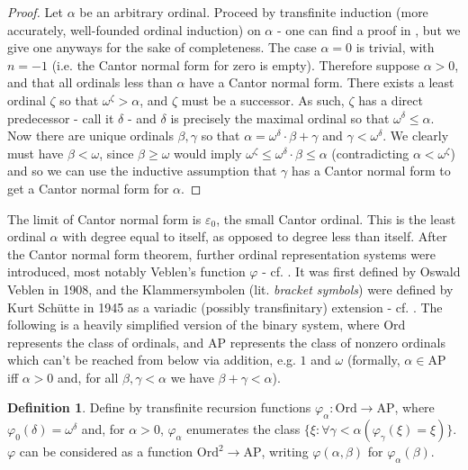 \documentclass{article}
\theoremstyle{definition}
\newtheorem{definition}{Definition}[section]
\theoremstyle{plain}
\theoremstyle{plain}
\theoremstyle{plain}
\theoremstyle{plain}
\theoremstyle{remark}
\theoremstyle{remark}
\theoremstyle{remark}
\theoremstyle{plain}
\theoremstyle{plain}
\begin{document}
\begin{proof}
Let $\alpha$ be an arbitrary ordinal. Proceed by transfinite induction (more accurately, well-founded ordinal induction) on $\alpha$ - one can find a proof in \cite{cantor}, but we give one anyways for the sake of completeness. The case $\alpha = 0$ is trivial, with $n = -1$ (i.e. the Cantor normal form for zero is empty). Therefore suppose $\alpha > 0$, and that all ordinals less than $\alpha$ have a Cantor normal form. There exists a least ordinal $\zeta$ so that $\omega^\zeta > \alpha$, and $\zeta$ must be a successor. As such, $\zeta$ has a direct predecessor - call it $\delta$ - and $\delta$ is precisely the maximal ordinal so that $\omega^\delta \leq \alpha$. Now there are unique ordinals $\beta, \gamma$ so that $\alpha = \omega^\delta \cdot \beta + \gamma$ and $\gamma < \omega^\delta$. We clearly must have $\beta < \omega$, since $\beta \geq \omega$ would imply $\omega^\zeta \leq \omega^\delta \cdot \beta \leq \alpha$ (contradicting $\alpha < \omega^\zeta$) and so we can use the inductive assumption that $\gamma$ has a Cantor normal form to get a Cantor normal form for $\alpha$.
\end{proof}

The limit of Cantor normal form is $\varepsilon_0$, the small Cantor ordinal. This is the least ordinal $\alpha$ with degree equal to itself, as opposed to degree less than itself. After the Cantor normal form theorem, further ordinal representation systems were introduced, most notably Veblen's function $\varphi$ - cf. \cite{veblen}. It was first defined by Oswald Veblen in 1908, and the Klammersymbolen (lit. \textit{bracket symbols}) were defined by Kurt Schütte in 1945 as a variadic (possibly transfinitary) extension - cf. \cite{schutte}. The following is a heavily simplified version of the binary system, where $\mathrm{Ord}$ represents the class of ordinals, and $\mathrm{AP}$ represents the class of nonzero ordinals which can't be reached from below via addition, e.g. $1$ and $\omega$ (formally, $\alpha \in \mathrm{AP}$ iff $\alpha > 0$ and, for all $\beta, \gamma < \alpha$ we have $\beta + \gamma < \alpha$).

\begin{definition}
Define by transfinite recursion functions $\varphi_\alpha: \mathrm{Ord} \to \mathrm{AP}$, where $\varphi_0(\delta) = \omega^\delta$ and, for $\alpha > 0$, $\varphi_\alpha$ enumerates the class $\{\xi: \forall \gamma < \alpha (\varphi_\gamma(\xi) = \xi)\}$. $\varphi$ can be considered as a function $\mathrm{Ord}^2 \rightarrow \mathrm{AP}$, writing $\varphi(\alpha,\beta)$ for $\varphi_\alpha(\beta)$.
\end{definition}
\end{document}
